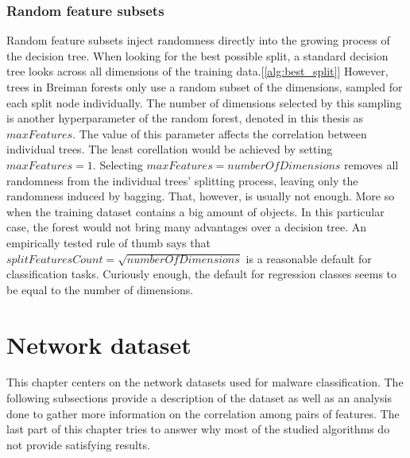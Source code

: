 \documentclass[11pt]{article}
\begin{document}
      \subsubsection{Random feature subsets}
        Random feature subsets inject randomness directly into the growing process of the decision tree. When looking for the best possible split, a standard decision tree looks across all dimensions of the training data.[\ref{alg:best_split}] However, trees in Breiman forests only use a random subset of the dimensions, sampled for each split node individually. The number of dimensions selected by this sampling is another hyperparameter of the random forest, denoted in this thesis as $maxFeatures$. The value of this parameter affects the correlation between individual trees. \cite{brabec} The least corellation would be achieved by setting $maxFeatures = 1$. Selecting $maxFeatures = numberOfDimensions$ removes all randomness from the individual trees' splitting process, leaving only the randomness induced by bagging. That, however, is usually not enough. More so when the training dataset contains a big amount of objects. In this particular case, the forest would not bring many advantages over a decision tree. An empirically tested rule of thumb says that $splitFeaturesCount = \sqrt{numberOfDimensions}$ is a reasonable default for classification tasks. \cite{ert} Curiously enough, the default for regression classes seems to be equal to the number of dimensions. \cite{ert}
  \newpage
  \section{Network dataset}
    \label{sec:datadesc}
    This chapter centers on the network datasets used for malware classification. The following subsections provide a description of the dataset as well as an analysis done to gather more information on the correlation among pairs of features. The last part of this chapter tries to answer why most of the studied algorithms do not provide satisfying results.
\end{document}
